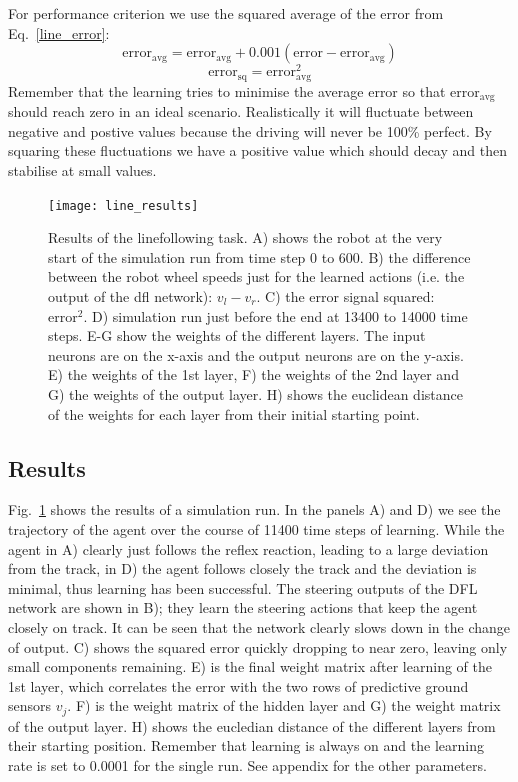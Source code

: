 \documentclass{llncs}
\begin{document}
For performance criterion we use the squared average of the error from Eq.~\ref{line_error}:
\begin{equation}
  \mathrm{error}_\mathrm{avg} =  \mathrm{error}_\mathrm{avg} + 0.001 (\mathrm{error} - \mathrm{error}_\mathrm{avg}) 
\end{equation}
\begin{equation}
  \mathrm{error}_\mathrm{sq} =  \mathrm{error}_\mathrm{avg}^2 \label{line_sqerr}
\end{equation}
Remember that the learning tries to minimise the average error so that $\mathrm{error}_\mathrm{avg}$
should reach zero in an ideal scenario. Realistically it will fluctuate between negative and
postive values because the driving will never be 100\% perfect. By squaring these fluctuations
we have a positive value which should decay and then stabilise at small values.


\begin{figure}[h!]
  \centering
  \texttt{[image: line\_results]}
  \caption{Results of the linefollowing task. A) shows the robot at
    the very start of the simulation run from time step 0 to 600.
    B) the difference between the robot wheel speeds just for the learned
    actions (i.e. the output of the dfl network): $v_l-v_r$.
    C) the error signal squared: $\mathrm{error}^2$.
    D) simulation run just before the end at 13400 to 14000 time steps.
    E-G show the weights of the different layers. The input neurons are on the x-axis
    and the output neurons are on the y-axis.
    E) the weights of the 1st layer, F) the weights of the 2nd layer and
    G) the weights of the output layer.
        H) shows the euclidean distance of the weights for each layer from their initial starting point.
    \label{line_results}}
\end{figure}



\subsection{Results}
Fig.~\ref{line_results} shows the results of a simulation run. In the panels
A) and D) we see the trajectory of the agent over the course of 11400 time steps 
of learning. While the agent in A) clearly
just follows the reflex reaction, leading to a large deviation from the track,
in D) the agent follows closely the track and the deviation is minimal, thus
learning has been successful. The steering outputs of the DFL network are shown
in B); they learn the steering actions that keep the agent closely on track.
It can be seen that the network clearly slows down in the change of output.
C) shows the squared error quickly dropping to near zero, leaving only small 
components remaining. E) is the final weight matrix after learning of the 1st layer, 
which correlates the error with the two rows of
predictive ground sensors $v_j$. F) is the weight matrix of the hidden layer and G)
the weight matrix of the output layer. H) shows the eucledian distance of the
different layers from their starting position. Remember that learning is
always on and the learning rate is set to 0.0001 for the single run. See appendix
for the other parameters.
\end{document}
